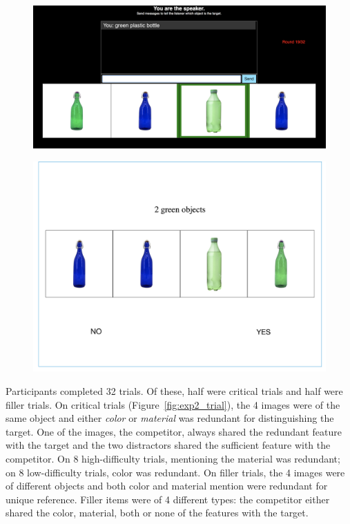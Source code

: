 \documentclass[12pt,letterpaper]{article}
\begin{document}
\begin{figure}[ht]
   \centering
   \begin{minipage}{0.48\columnwidth}
   \centering
   \includegraphics[width=\textwidth]{img/exp2_trial.png}
   \label{fig:exp2_trial}
   \end{minipage}%
   \hfill
   \begin{minipage}{0.48\columnwidth}
   \centering
   \includegraphics[width=\textwidth]{img/exp3_trial.png}
   \label{fig:exp3_trial}
   \end{minipage}
\end{figure}

Participants completed 32 trials. Of these, half were critical trials and half were filler trials. On critical trials (Figure~\ref{fig:exp2_trial}), the 4 images were of the same object and either \textit{color} or \textit{material} was redundant for distinguishing the target. One of the images, the competitor, always shared the redundant feature with the target and the two distractors shared the sufficient feature with the competitor. On 8 high-difficulty trials, mentioning the material was redundant; on 8 low-difficulty trials, color was redundant. On filler trials, the 4 images were of different objects and both color and material mention were redundant for unique reference. Filler items were of 4 different types: the competitor either shared the color, material, both or none of the features with the target. 
\end{document}
